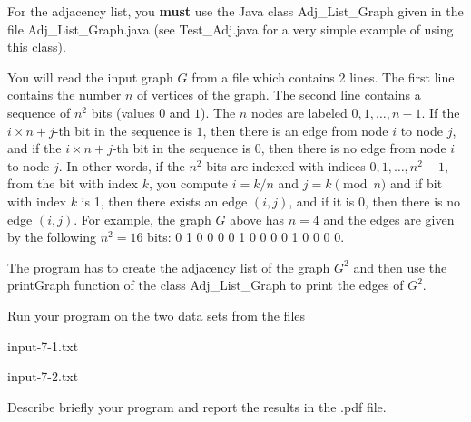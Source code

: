 \documentclass[11pt]{article}
\begin{document}
For the adjacency list, you \textbf{must} use the Java class \textsf{Adj\_List\_Graph} given in the file \textsf{Adj\_List\_Graph.java} (see \textsf{Test\_Adj.java} for a very simple example of using this class).

You will read the input graph $G$ from a file which contains 2 lines. The first line contains the number $n$ of vertices of the graph. The second line contains a sequence of $n^2$  bits (values $0$ and $1$). The $n$ nodes are labeled $0,1, \ldots, n-1$. If the $i \times n + j$-th  bit in the sequence is $1$, then there is an edge from node $i$ to node $j$, and if the $i \times n + j$-th bit in the sequence is $0$,  then there is no edge from node $i$ to node $j$. In other words, if the $n^2$  bits are indexed with indices $0, 1, \ldots, n^2-1$,  from the bit with index $k$, you compute $i=k/n$ and $j = k \pmod{n}$ and if bit with index $k$ is 1, then there exists an edge $(i,j)$, and if it is $0$, then there is no edge $(i, j)$. For example, the graph $G$ above has $n=4$ and the edges are given by the following $n^2 = 16$ bits: 0 1 0 0      0 0 1 0      0 0 0 1   0 0 0 0.

The program has to create the adjacency list of the graph $G^2$ and then use the \textsf{printGraph} function of the class \textsf{Adj\_List\_Graph} to print the edges of $G^2$.

Run your program on the two data sets from the files

input-7-1.txt 

input-7-2.txt

Describe briefly your program and report the results in the .pdf file.
\bigskip
\end{document}
